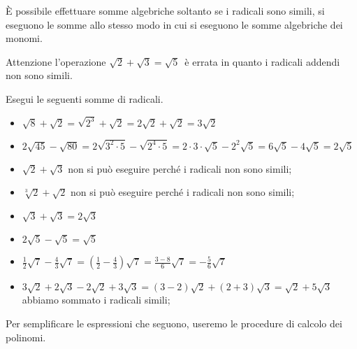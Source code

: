 È possibile effettuare somme algebriche soltanto se i radicali sono simili,
si eseguono le somme allo stesso modo in cui si eseguono le somme
algebriche
dei monomi.

Attenzione l'operazione $\sqrt{2}+\sqrt{3}=\sqrt 5$\, è errata in quanto i
radicali addendi non sono simili.

\newpage %

 \begin{esempio}
Esegui le seguenti somme di radicali.
\begin{itemize}
 \item $\sqrt 8+\sqrt{2}=\sqrt{2^3}+\sqrt{2}=2\sqrt{2}+\sqrt{2}=3\sqrt{2}$
 \item $2\sqrt{45}-\sqrt{80}=2\sqrt{3^2\cdot 5}-\sqrt{2^4\cdot 5}=
        2\cdot 3\cdot \sqrt 5-2^2\sqrt 5=6\sqrt 5-4\sqrt 5=2\sqrt 5$
 \item $\sqrt{2}+\sqrt{3}$
  non si può eseguire perché i radicali non sono simili;
 \item $\sqrt[3]2+\sqrt{2}$
  non si può eseguire perché i radicali non sono simili;
 \item $\sqrt{3}+\sqrt{3}=2\sqrt{3}$
 \item $2\sqrt 5-\sqrt 5=\sqrt 5$
 \item $\frac 1 2\sqrt 7-\frac 4 3\sqrt 7=
        \left(\frac 1 2-\frac 4 3\right)\sqrt 7=\frac{3-8} 6\sqrt 7=
        -\frac 5 6\sqrt 7$
 \item $3\sqrt{2}+2\sqrt{3}-2\sqrt{2}+3\sqrt{3}=(3-2)\sqrt{2}+(2+3)\sqrt{3}=
        \sqrt{2}+5\sqrt{3}$ abbiamo sommato i radicali simili;
\end{itemize}
 \end{esempio}

Per semplificare le espressioni che seguono, useremo le procedure di
calcolo dei polinomi.


